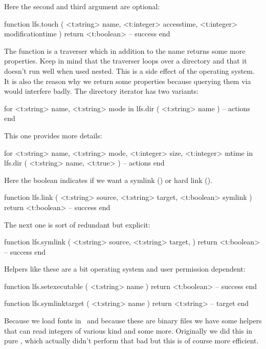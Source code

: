Here the second and third argument are optional:

\starttyping[option=LUA]
function lfs.touch (
    <t:string>  name,
    <t:integer> accesstime,
    <t:integer> modificationtime
)
    return <t:boolean> -- success
end
\stoptyping

The  function is a traverser which in addition to the name returns
some more properties. Keep in mind that the traverser loops over a directory and
that it doesn't run well when used nested. This is a side effect of the operating
system. It is also the reason why we return some properties because querying them
via  would interfere badly. The directory iterator has two
variants:

\starttyping[option=LUA]
for
    <t:string> name,
    <t:string> mode
in lfs.dir (
    <t:string> name
)
    -- actions
end
\stoptyping

This one provides more details:

\starttyping[option=LUA]
for
    <t:string>  name,
    <t:string>  mode,
    <t:integer> size,
    <t:integer> mtime
in lfs.dir (
    <t:string>  name,
    <t:true>
)
    -- actions
end
\stoptyping

Here the boolean indicates if we want a symlink () or hard link
().

\starttyping[option=LUA]
function lfs.link (
    <t:string>  source,
    <t:string>  target,
    <t:boolean> symlink
)
    return <t:boolean> -- success
end
\stoptyping

The next one is sort of redundant but explicit:

\starttyping[option=LUA]
function lfs.symlink (
    <t:string>  source,
    <t:string>  target,
)
    return <t:boolean> -- success
end
\stoptyping

Helpers like these are a bit operating system and user permission dependent:

\starttyping[option=LUA]
function lfs.setexecutable ( <t:string> name )
    return <t:boolean> -- success
end
\stoptyping

\starttyping[option=LUA]
function lfs.symlinktarget ( <t:string> name )
    return <t:string> -- target
end
\stoptyping

\stopsubsection

\startsubsection[title=Reading from a file]

Because we load fonts in \LUA\ and because these are binary files we have some
helpers that can read integers of various kind and some more. Originally we did
this in pure \LUA, which actually didn't perform that bad but this is of course
more efficient.

